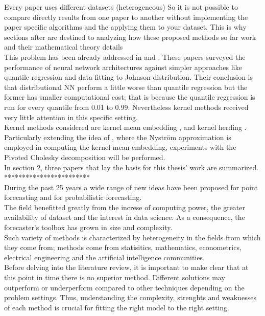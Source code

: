 Every paper uses different datasets (heterogeneous)
So it is not possible to compare directly results
from one paper to another without implementing the
paper specific algorithms and the applying them to
your dataset.
This is why sections after are destined to analyzing
how these proposed methods so far work and their mathematical
theory details
\\
This problem has been already addressed in \cite{probablistic_electricity_forecast} and \cite{probablistic_electricity_forecast2}. 
These papers surveyed the performance of neural network architectures against simpler approaches like quantile regression and data fitting to Johnson distribution. Their conclusion is that distributional NN perform a little worse than quantile regression but the former has smaller computational cost; that is because the quantile regression is run for every quantile from 0.01 to 0.99.
Nevertheless kernel methods received very little attention in this specific setting.
\\
Kernel methods considered are kernel mean embedding \cite{pmlr}, \cite{Muandet_2017} and kernel herding \cite{supersamples}. Particularly extending the idea of \cite{2022nystrom}, where the Nyström approximation is employed in computing the kernel mean embedding, experiments with the Pivoted Cholesky decomposition will be performed.
\\
In section 2, three papers that lay the basis for this thesis’ work are summarized.
\\
************************
\\
During the past 25 years %
a wide range of new ideas have been proposed for point forecasting and for probabilistic forecasting.
\\
The field benefitted greatly from the increse of computing power, the greater availability of dataset and the interest in data science.
As a consequence, the forecaster's toolbox has grown in size and complexity.
\\
Such variety of methods is characterized by heterogeneity in the fields from which they come from; methods come from statisitics, mathematics, econometrics, electrical engineering and the artificial intelligence communities.
\\
Before delving into the literature review, it is important to make clear that at this point in time there is no superior method. Different solutions may outperform or underperform compared to other techniques depending on the problem settings. Thus, understanding the complexity, strenghts and weaknesses of each method is crucial for fitting the right model to the right setting.
